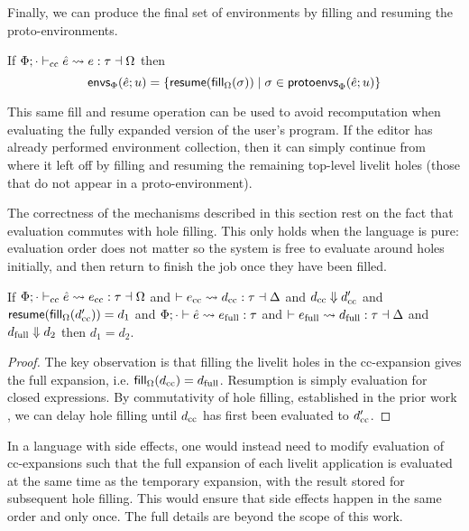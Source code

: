 Finally, we can produce the final set of environments by filling and resuming the proto-environments.
\begin{definition}
    If $\Phi; \cdot \vdash_\text{cc} \hat e \leadsto e : \tau \dashv \Omega$
    then \[\mathsf{envs}_{\Phi}(\hat e; u) = \{\mathsf{resume}(\mathsf{fill}_{\Omega}(\sigma)) \mid \sigma \in \mathsf{protoenvs}_{\Phi}(\hat e; u)\}\]
\end{definition}

This same fill and resume operation can be used to avoid recomputation when evaluating the fully expanded version of the user's program.
If the editor has already performed environment collection, then it can simply continue from where it left off
by filling and resuming
the remaining top-level livelit holes (those that do not appear in a proto-environment).

The correctness of the mechanisms described in this section rest on the fact that evaluation commutes with hole filling.
This only holds when the language is pure: evaluation order does not matter
so the system is free to evaluate around holes initially,
and then return to finish the job once they have been filled.

\begin{theorem}
    If $\Phi; \cdot \vdash_\text{cc} \hat e \leadsto e_\text{cc} : \tau \dashv \Omega$ and $\vdash e_\text{cc} \leadsto d_\text{cc} : \tau \dashv \Delta$
    and $d_\text{cc} \Downarrow d_\text{cc}'$ and $\mathsf{resume}(\mathsf{fill}_{\Omega}(d_\text{cc}')) = d_1$
    and $\Phi; \cdot \vdash \hat e \leadsto e_\text{full} : \tau$
    and $\vdash e_\text{full} \leadsto d_\text{full} : \tau \dashv \Delta$
    and $d_\text{full} \Downarrow d_2$ then $d_1 = d_2$.
\end{theorem}
\begin{proof}
    The key observation is that filling the livelit holes in the cc-expansion gives the full expansion,
    i.e. $\mathsf{fill}_{\Omega}(d_\text{cc}) = d_\text{full}$. Resumption is simply evaluation for closed expressions.
    By commutativity of hole filling, established in the prior work \cite{HazelnutLive},
    we can delay hole filling until $d_\text{cc}$ has first been evaluated to
    $d_\text{cc}'$.
\end{proof}

In a language with side effects, one would instead need to modify evaluation of
cc-expansions such that the full expansion of each livelit application is evaluated at the same time as the
temporary expansion,
with the result stored for subsequent hole filling. This would ensure that
side effects happen in the same order and only once. The full details are beyond the scope of this work.

